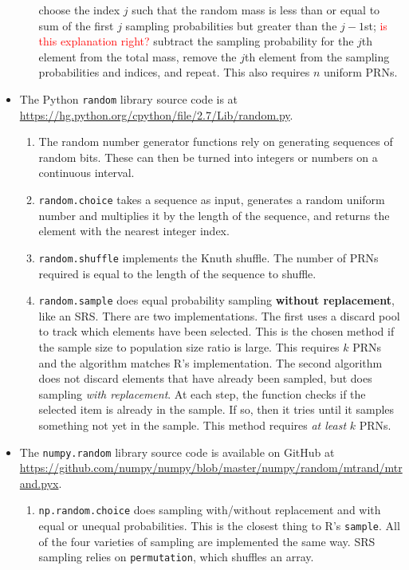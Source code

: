 \documentclass[12pt]{article}
\begin{document}
\begin{itemize}
\begin{enumerate}
choose the index $j$ such that the random mass is less than or equal to sum of the first $j$ sampling probabilities but greater than the $j-1$st; \textcolor{red}{is this explanation right?}
subtract the sampling probability for the $j$th element from the total mass, remove the $j$th element from the sampling probabilities and indices, and repeat.
This also requires $n$ uniform PRNs.
\end{enumerate}
\item The Python \texttt{random} library source code is at \url{https://hg.python.org/cpython/file/2.7/Lib/random.py}.
\begin{enumerate}
\item The random number generator functions rely on generating sequences of random bits.
These can then be turned into integers or numbers on a continuous interval.
\item \texttt{random.choice} takes a sequence as input, generates a random uniform number and multiplies it by the length of the sequence, and returns the element with the nearest integer index.
\item \texttt{random.shuffle} implements the Knuth shuffle. 
The number of PRNs required is equal to the length of the sequence to shuffle.
\item \texttt{random.sample} does equal probability sampling \textbf{without replacement}, like an SRS.
There are two implementations.
The first uses a discard pool to track which elements have been selected.
This is the chosen method if the sample size to population size ratio is large.
This requires $k$ PRNs and the algorithm matches R's implementation.
The second algorithm does not discard elements that have already been sampled, but does sampling \textit{with replacement}.
At each step, the function checks if the selected item is already in the sample.
If so, then it tries until it samples something not yet in the sample.
This method requires \textit{at least} $k$ PRNs.
\end{enumerate}
\item The \texttt{numpy.random} library source code is available on GitHub at \url{https://github.com/numpy/numpy/blob/master/numpy/random/mtrand/mtrand.pyx}.
\begin{enumerate}
\item \texttt{np.random.choice} does sampling with/without replacement and with equal or unequal probabilities.
This is the closest thing to R's \texttt{sample}.
All of the four varieties of sampling are implemented the same way.
SRS sampling relies on \texttt{permutation}, which shuffles an array.
\end{enumerate}
\end{itemize}
\end{document}
